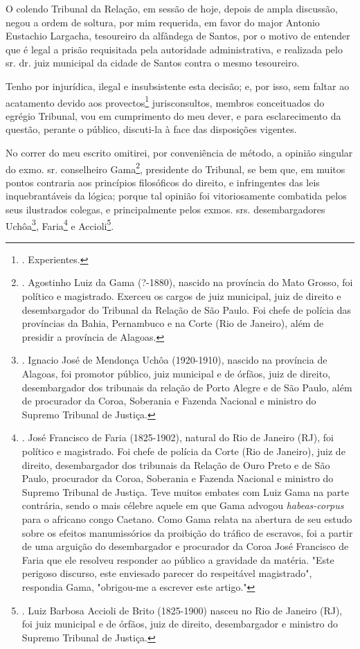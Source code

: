 O colendo Tribunal da Relação, em sessão de hoje, depois de ampla
discussão, negou a ordem de soltura, por mim requerida, em favor do
major Antonio Eustachio Largacha, tesoureiro da alfândega de Santos, por
o motivo de entender que é legal a prisão requisitada pela autoridade
administrativa, e realizada pelo sr. dr. juiz municipal da cidade de
Santos contra o mesmo tesoureiro.

Tenho por injurídica, ilegal e insubsistente esta decisão; e, por isso,
sem faltar ao acatamento devido aos provectos\footnote{. Experientes.}
jurisconsultos, membros conceituados do egrégio Tribunal, vou em
cumprimento do meu dever, e para esclarecimento da questão, perante o
público, discuti-la à face das disposições vigentes.

No correr do meu escrito omitirei, por conveniência de método, a opinião
singular do exmo. sr. conselheiro Gama\footnote{. Agostinho Luiz da Gama
  (?-1880), nascido na província do Mato Grosso, foi político e
  magistrado. Exerceu os cargos de juiz municipal, juiz de direito e
  desembargador do Tribunal da Relação de São Paulo. Foi chefe de
  polícia das províncias da Bahia, Pernambuco e na Corte (Rio de
  Janeiro), além de presidir a província de Alagoas.}, presidente do
Tribunal, se bem que, em muitos pontos contraria aos princípios
filosóficos do direito, e infringentes das leis inquebrantáveis da
lógica; porque tal opinião foi vitoriosamente combatida pelos seus
ilustrados colegas, e principalmente pelos exmos. srs. desembargadores
Uchôa\footnote{. Ignacio José de Mendonça Uchôa (1920-1910), nascido na
  província de Alagoas, foi promotor público, juiz municipal e de
  órfãos, juiz de direito, desembargador dos tribunais da relação de
  Porto Alegre e de São Paulo, além de procurador da Coroa, Soberania e
  Fazenda Nacional e ministro do Supremo Tribunal de Justiça.},
Faria\footnote{. José Francisco de Faria (1825-1902), natural do Rio de
  Janeiro (RJ), foi político e magistrado. Foi chefe de polícia da Corte
  (Rio de Janeiro), juiz de direito, desembargador dos tribunais da
  Relação de Ouro Preto e de São Paulo, procurador da Coroa, Soberania e
  Fazenda Nacional e ministro do Supremo Tribunal de Justiça. Teve
  muitos embates com Luiz Gama na parte contrária, sendo o mais célebre
  aquele em que Gama advogou \emph{habeas-corpus} para o africano congo
  Caetano. Como Gama relata na abertura de seu estudo sobre os efeitos
  manumissórios da proibição do tráfico de escravos, foi a partir de uma
  arguição do desembargador e procurador da Coroa José Francisco de
  Faria que ele resolveu responder ao público a gravidade da matéria.
  "Este perigoso discurso, este enviesado parecer do respeitável
  magistrado", respondia Gama, "obrigou-me a escrever este artigo."} e
Accioli\footnote{. Luiz Barbosa Accioli de Brito (1825-1900) nasceu no
  Rio de Janeiro (RJ), foi juiz municipal e de órfãos, juiz de direito,
  desembargador e ministro do Supremo Tribunal de Justiça.}.

